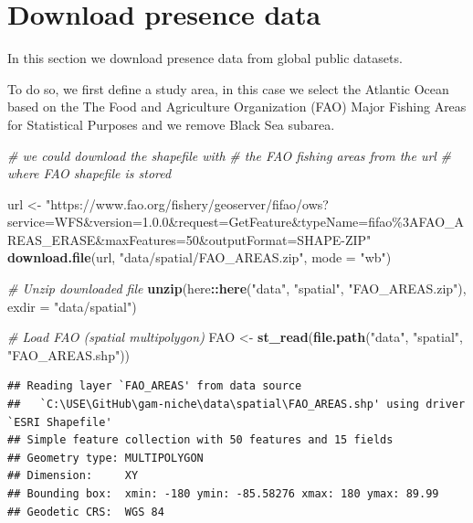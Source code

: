 \documentclass[
]{book}
\newenvironment{Shaded}{\begin{snugshade}}{\end{snugshade}}
\newcommand{\AttributeTok}[1]{\textcolor[rgb]{0.13,0.29,0.53}{#1}}
\newcommand{\CommentTok}[1]{\textcolor[rgb]{0.56,0.35,0.01}{\textit{#1}}}
\newcommand{\FunctionTok}[1]{\textcolor[rgb]{0.13,0.29,0.53}{\textbf{#1}}}
\newcommand{\NormalTok}[1]{#1}
\newcommand{\OtherTok}[1]{\textcolor[rgb]{0.56,0.35,0.01}{#1}}
\newcommand{\SpecialCharTok}[1]{\textcolor[rgb]{0.81,0.36,0.00}{\textbf{#1}}}
\newcommand{\StringTok}[1]{\textcolor[rgb]{0.31,0.60,0.02}{#1}}
\begin{document}
\section{Download presence data}\label{download-presence-data}

In this section we download presence data from global public datasets.

To do so, we first define a study area, in this case we select the Atlantic Ocean based on the The Food and Agriculture Organization (FAO) Major Fishing Areas for Statistical Purposes and we remove Black Sea subarea.

\begin{Shaded}
\begin{Highlighting}[]
\CommentTok{\# we could download the shapefile with}
\CommentTok{\# the FAO fishing areas from the url}
\CommentTok{\# where FAO shapefile is stored}

\NormalTok{url }\OtherTok{\textless{}{-}} \StringTok{"https://www.fao.org/fishery/geoserver/fifao/ows?service=WFS\&version=1.0.0\&request=GetFeature\&typeName=fifao\%3AFAO\_AREAS\_ERASE\&maxFeatures=50\&outputFormat=SHAPE{-}ZIP"}
\FunctionTok{download.file}\NormalTok{(url, }\StringTok{"data/spatial/FAO\_AREAS.zip"}\NormalTok{,}
    \AttributeTok{mode =} \StringTok{"wb"}\NormalTok{)}

\CommentTok{\# Unzip downloaded file}
\FunctionTok{unzip}\NormalTok{(here}\SpecialCharTok{::}\FunctionTok{here}\NormalTok{(}\StringTok{"data"}\NormalTok{, }\StringTok{"spatial"}\NormalTok{, }\StringTok{"FAO\_AREAS.zip"}\NormalTok{),}
    \AttributeTok{exdir =} \StringTok{"data/spatial"}\NormalTok{)}

\CommentTok{\# Load FAO (spatial multipolygon)}
\NormalTok{FAO }\OtherTok{\textless{}{-}} \FunctionTok{st\_read}\NormalTok{(}\FunctionTok{file.path}\NormalTok{(}\StringTok{"data"}\NormalTok{, }\StringTok{"spatial"}\NormalTok{,}
    \StringTok{"FAO\_AREAS.shp"}\NormalTok{))}
\end{Highlighting}
\end{Shaded}

\begin{verbatim}
## Reading layer `FAO_AREAS' from data source 
##   `C:\USE\GitHub\gam-niche\data\spatial\FAO_AREAS.shp' using driver `ESRI Shapefile'
## Simple feature collection with 50 features and 15 fields
## Geometry type: MULTIPOLYGON
## Dimension:     XY
## Bounding box:  xmin: -180 ymin: -85.58276 xmax: 180 ymax: 89.99
## Geodetic CRS:  WGS 84
\end{verbatim}
\end{document}
